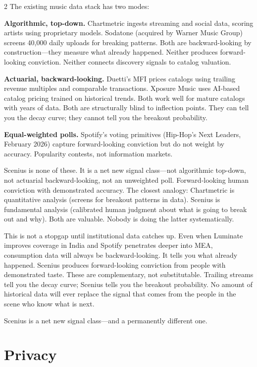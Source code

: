 \documentclass[9pt,oneside]{amsart}
\begin{document}
\begin{multicols}{2}
The existing music data stack has two modes:

\textbf{Algorithmic, top-down.} Chartmetric ingests streaming and social data, scoring artists using proprietary models. Sodatone (acquired by Warner Music Group) screens 40,000 daily uploads for breaking patterns. Both are backward-looking by construction---they measure what already happened. Neither produces forward-looking conviction. Neither connects discovery signals to catalog valuation.

\textbf{Actuarial, backward-looking.} Duetti's MFI prices catalogs using trailing revenue multiples and comparable transactions. Xposure Music uses AI-based catalog pricing trained on historical trends. Both work well for mature catalogs with years of data. Both are structurally blind to inflection points. They can tell you the decay curve; they cannot tell you the breakout probability.

\textbf{Equal-weighted polls.} Spotify's voting primitives (Hip-Hop's Next Leaders, February 2026) capture forward-looking conviction but do not weight by accuracy. Popularity contests, not information markets.

Scenius is none of these. It is a net new signal class---not algorithmic top-down, not actuarial backward-looking, not an unweighted poll. Forward-looking human conviction with demonstrated accuracy. The closest analogy: Chartmetric is quantitative analysis (screens for breakout patterns in data). Scenius is fundamental analysis (calibrated human judgment about what is going to break out and why). Both are valuable. Nobody is doing the latter systematically.

This is not a stopgap until institutional data catches up. Even when Luminate improves coverage in India and Spotify penetrates deeper into MEA, consumption data will always be backward-looking. It tells you what already happened. Scenius produces forward-looking conviction from people with demonstrated taste. These are complementary, not substitutable. Trailing streams tell you the decay curve; Scenius tells you the breakout probability. No amount of historical data will ever replace the signal that comes from the people in the scene who know what is next.

Scenius is a net new signal class---and a permanently different one.

\section{Privacy}


\end{multicols}
\end{document}
